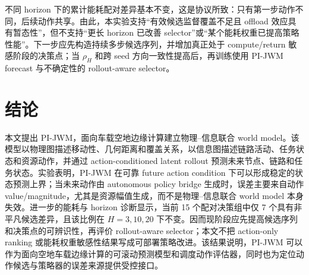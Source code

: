 \documentclass[letterpaper,journal]{IEEEtran}
\newcommand{\pjwm}{PI-JWM}
\begin{document}
不同 horizon 下的累计能耗配对差异基本不变，这是协议所致：只有第一步动作不同，后续动作共享。由此，本实验支持“有效候选监督覆盖不足且 offload 效应具有暂态性”，但不支持“更长 horizon 已改善 selector”或“某个能耗权重已提高策略性能”。下一步应先构造持续多步候选序列，并增加真正处于 compute/return 敏感阶段的决策点；当 $\rho_H$ 和跨 seed 方向一致性提高后，再训练使用 PI-JWM forecast 与不确定性的 rollout-aware selector。

\section{结论}

本文提出 \pjwm{}，面向车载空地边缘计算建立物理--信息联合 world model。该模型以物理图描述移动性、几何距离和覆盖关系，以信息图描述链路活动、任务状态和资源动作，并通过 action-conditioned latent rollout 预测未来节点、链路和任务状态。实验表明，\pjwm{} 在可靠 future action condition 下可以形成稳定的状态预测上界；当未来动作由 autonomous policy bridge 生成时，误差主要来自动作 value/magnitude，尤其是资源幅值生成，而不是物理--信息联合 world model 本身失效。进一步的能耗与 horizon 诊断显示，当前 15 个配对决策组中仅 7 个具有非平凡候选差异，且该比例在 $H=3,10,20$ 下不变。因而现阶段应先提高候选序列和决策点的可辨识性，再评价 rollout-aware selector；本文不把 action-only ranking 或能耗权重敏感性结果写成可部署策略改进。该结果说明，\pjwm{} 可以作为面向空地车载边缘计算的可滚动预测模型和调度动作评估器，同时也为定位动作候选与策略器的误差来源提供受控接口。
\sloppy
\end{document}
